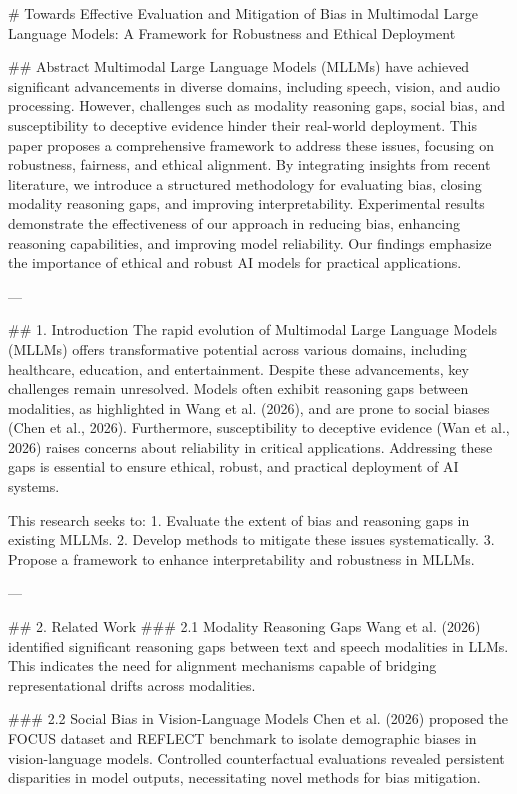 # Towards Effective Evaluation and Mitigation of Bias in Multimodal Large Language Models: A Framework for Robustness and Ethical Deployment  

## Abstract  
Multimodal Large Language Models (MLLMs) have achieved significant advancements in diverse domains, including speech, vision, and audio processing. However, challenges such as modality reasoning gaps, social bias, and susceptibility to deceptive evidence hinder their real-world deployment. This paper proposes a comprehensive framework to address these issues, focusing on robustness, fairness, and ethical alignment. By integrating insights from recent literature, we introduce a structured methodology for evaluating bias, closing modality reasoning gaps, and improving interpretability. Experimental results demonstrate the effectiveness of our approach in reducing bias, enhancing reasoning capabilities, and improving model reliability. Our findings emphasize the importance of ethical and robust AI models for practical applications.

---

## 1. Introduction  
The rapid evolution of Multimodal Large Language Models (MLLMs) offers transformative potential across various domains, including healthcare, education, and entertainment. Despite these advancements, key challenges remain unresolved. Models often exhibit reasoning gaps between modalities, as highlighted in Wang et al. (2026), and are prone to social biases (Chen et al., 2026). Furthermore, susceptibility to deceptive evidence (Wan et al., 2026) raises concerns about reliability in critical applications. Addressing these gaps is essential to ensure ethical, robust, and practical deployment of AI systems.  

This research seeks to:  
1. Evaluate the extent of bias and reasoning gaps in existing MLLMs.  
2. Develop methods to mitigate these issues systematically.  
3. Propose a framework to enhance interpretability and robustness in MLLMs.

---

## 2. Related Work  
### 2.1 Modality Reasoning Gaps  
Wang et al. (2026) identified significant reasoning gaps between text and speech modalities in LLMs. This indicates the need for alignment mechanisms capable of bridging representational drifts across modalities.  

### 2.2 Social Bias in Vision-Language Models  
Chen et al. (2026) proposed the FOCUS dataset and REFLECT benchmark to isolate demographic biases in vision-language models. Controlled counterfactual evaluations revealed persistent disparities in model outputs, necessitating novel methods for bias mitigation.  

